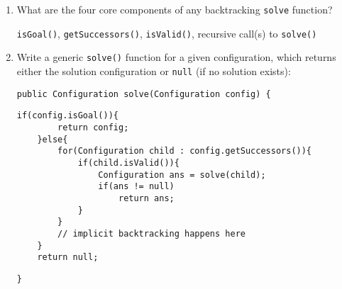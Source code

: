 \begin{enumerate}
\item What are the four core components of any backtracking \texttt{solve} function?

\begin{answer}
\texttt{isGoal()}, \texttt{getSuccessors()}, \texttt{isValid()}, recursive call(s) to \texttt{solve()}
\end{answer}

\item Write a generic \texttt{solve()} function for a given configuration, which returns either the solution configuration or \texttt{null} (if no solution exists):
\vspace{.25in}
\begin{lstlisting}[numbers=none]
public Configuration solve(Configuration config) {
\end{lstlisting}
\begin{answer}
\begin{lstlisting}[numbers=none]
	if(config.isGoal()){
		return config;
	}else{
		for(Configuration child : config.getSuccessors()){
			if(child.isValid()){
				Configuration ans = solve(child);
				if(ans != null)
					return ans;
			}
		}
		// implicit backtracking happens here
	}
	return null;
\end{lstlisting}
\end{answer}
\begin{lstlisting}[numbers=none]
}
\end{lstlisting}
\end{enumerate}